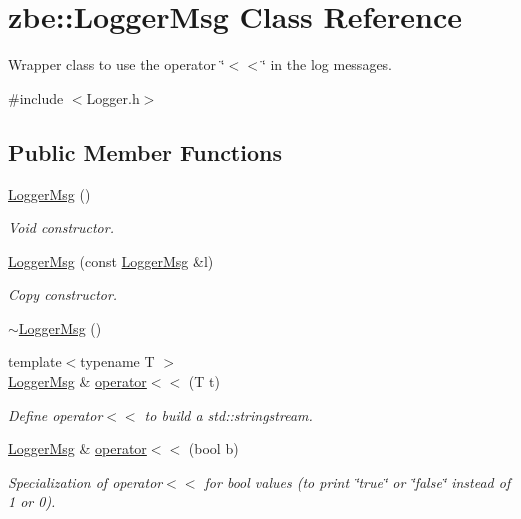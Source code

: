 \hypertarget{classzbe_1_1_logger_msg}{}\section{zbe\+:\+:Logger\+Msg Class Reference}
\label{classzbe_1_1_logger_msg}


Wrapper class to use the operator \char`\"{}$<$$<$\char`\"{} in the log messages.  




{\ttfamily \#include $<$Logger.\+h$>$}

\subsection*{Public Member Functions}
\begin{DoxyCompactItemize}
\item 
\hyperlink{classzbe_1_1_logger_msg_a6e2d3bd59184b8aef437dd8d73beefed}{Logger\+Msg} ()
\begin{DoxyCompactList}\small\item\em Void constructor. \end{DoxyCompactList}\item 
\hyperlink{classzbe_1_1_logger_msg_ac332c2a9128e05a0aa59e9eb43a6b7b6}{Logger\+Msg} (const \hyperlink{classzbe_1_1_logger_msg}{Logger\+Msg} \&l)
\begin{DoxyCompactList}\small\item\em Copy constructor. \end{DoxyCompactList}\item 
\hyperlink{classzbe_1_1_logger_msg_aa51d696e4c27d65739c8d03d3a7269a9}{$\sim$\+Logger\+Msg} ()
\item 
{\footnotesize template$<$typename T $>$ }\\\hyperlink{classzbe_1_1_logger_msg}{Logger\+Msg} \& \hyperlink{classzbe_1_1_logger_msg_a6b39d79ba4c3cd4add6c509fe06d0dd1}{operator$<$$<$} (T t)
\begin{DoxyCompactList}\small\item\em Define operator$<$$<$ to build a std\+::stringstream. \end{DoxyCompactList}\item 
\hyperlink{classzbe_1_1_logger_msg}{Logger\+Msg} \& \hyperlink{classzbe_1_1_logger_msg_acca04ee3162cafd8a3fd1e646caba5f7}{operator$<$$<$} (bool b)
\begin{DoxyCompactList}\small\item\em Specialization of operator$<$$<$ for bool values (to print \char`\"{}true\char`\"{} or \char`\"{}false\char`\"{} instead of 1 or 0). \end{DoxyCompactList}\end{DoxyCompactItemize}
